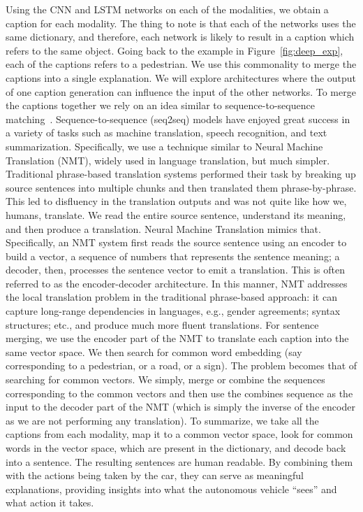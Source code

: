 Using the CNN and LSTM networks on each of the modalities, we obtain a caption for each modality. The thing to note is that each of the networks uses the same dictionary, and therefore, each network is likely to result in a caption which refers to the same object. 
Going back to the example in Figure~\ref{fig:deep_exp}, each of the captions refers to a pedestrian. We use this commonality to merge the captions into a single explanation. We will explore architectures where the output of one caption generation can influence the input of the other networks. 
To merge the captions together we rely on an idea similar to sequence-to-sequence matching~\cite{sutskever2014sequence}.
Sequence-to-sequence (seq2seq) models have enjoyed great success in a variety of tasks such as machine translation, speech recognition, and text summarization.
Specifically, we use a technique similar to Neural Machine Translation (NMT), widely used in language translation, but much simpler. Traditional phrase-based translation systems performed their task by breaking up source sentences into multiple chunks and then translated them phrase-by-phrase. This led to disfluency in the translation outputs and was not quite like how we, humans, translate. We read the entire source sentence, understand its meaning, and then produce a translation. Neural Machine Translation mimics that.
Specifically, an NMT system first reads the source sentence using an encoder to build a vector, a sequence of numbers that represents the sentence meaning; a decoder, then, processes the sentence vector to emit a translation.
This is often referred to as the encoder-decoder architecture. 
In this manner, NMT addresses the local translation problem in the traditional phrase-based approach: it can capture long-range dependencies in languages, e.g., gender agreements; syntax structures; etc., and produce much more fluent translations.
For sentence merging, we use the encoder part of the NMT to translate each caption into the same vector space. 
We then search for common word embedding (say corresponding to a pedestrian, or a road, or a sign). The problem becomes that of searching for common vectors. We simply, merge or combine the sequences corresponding to the common vectors and then use the combines sequence as the input to the decoder part of the NMT (which is simply the inverse of the encoder as we are not performing any translation). To summarize, we take all the captions from each modality, map it to a common vector space, look for common words in the vector space, which are present in the dictionary, and decode back into a sentence. 
The resulting sentences are human readable.
By combining them with the actions being taken by the car, they can serve as meaningful explanations, providing insights into what the autonomous vehicle ``sees'' and what action it takes. 

